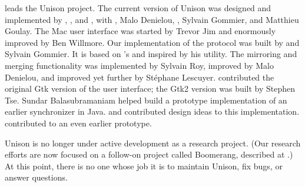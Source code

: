 \documentclass{article}
\begin{document}


 leads the
Unison project.
%
The current version of Unison was designed and implemented by
    ,
    ,
and
    ,
with
    ,
    {Malo Denielou},
    ,
    Sylvain Gommier, and
    Matthieu Goulay.
%
The Mac user interface was started by Trevor Jim and enormously improved by
Ben Willmore.
%
Our implementation of the
  protocol was built by
  and Sylvain Gommier.  It is based on
  's
  and inspired by his
  utility.
%
The mirroring and merging functionality was implemented by
  Sylvain Roy, improved by Malo Denielou, and improved yet further by
  St\'ephane Lescuyer.
%
 contributed the original Gtk version of the user
  interface; the Gtk2 version was built by Stephen Tse.
%
Sundar Balasubramaniam helped build a prototype implementation of
an earlier synchronizer in Java.
and
 contributed design
ideas to this implementation.
contributed to an even earlier prototype.





Unison is no longer under active development as a research
project.  (Our research efforts are now focused on a follow-on
project called Boomerang, described at
.)
At this point, there is no one whose job it is to maintain Unison,
fix bugs, or answer questions.
\end{document}
